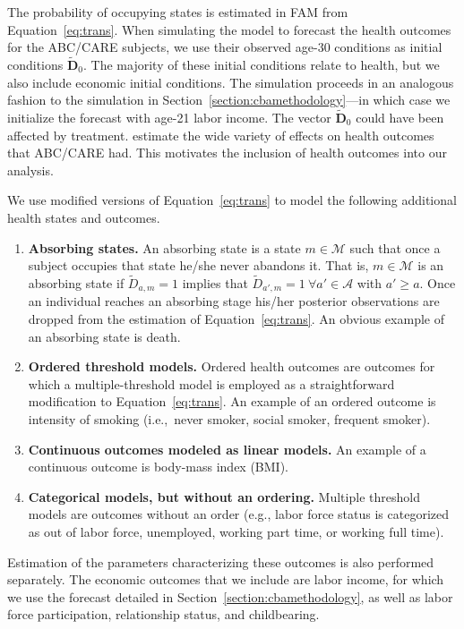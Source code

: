 The probability of occupying states is estimated in FAM from Equation~\eqref{eq:trans}. When simulating the model to forecast the health outcomes for the ABC/CARE subjects, we use their observed age-30 conditions as initial conditions  $\tilde{\bm{D}}_0$. The majority of these initial conditions relate to health, but we also include economic initial conditions. The simulation proceeds in an analogous fashion to the simulation in Section~\ref{section:cbamethodology}---in which case we initialize the forecast with age-21 labor income. The vector $\tilde{\bm{D}}_0$ could have been affected by treatment. \citet{Campbell_Conti_etal_2014_EarlyChildhoodInvestments} estimate the wide variety of effects on health outcomes that ABC/CARE had. This motivates the inclusion of health outcomes into our analysis.

We use modified versions of Equation~\eqref{eq:trans} to model the following additional health states and outcomes.

\begin{enumerate}
\item \textbf{Absorbing states.} An absorbing state is a state $m \in \mathcal{M}$ such that once a subject occupies that state he/she never abandons it. That is, $m \in \mathcal{M}$ is an absorbing state if $\tilde{D}_{a,m} = 1$ implies that $\tilde{D}_{a',m} = 1 \ \forall a' \in \mathcal{A}$ with $a' \geq a.$ Once an individual reaches an absorbing stage his/her posterior observations are dropped from the estimation of Equation~\eqref{eq:trans}. An obvious example of an absorbing state is death.
\item \textbf{Ordered threshold models.} Ordered health outcomes are outcomes for which a multiple-threshold model is employed as a straightforward modification to Equation~\eqref{eq:trans}. An example of an ordered outcome is intensity of smoking (i.e.,\ never smoker, social smoker, frequent smoker).
\item \textbf{Continuous outcomes modeled as linear models.} An example of a continuous outcome is body-mass index (BMI).
\item \textbf{Categorical models, but without an ordering.} Multiple threshold models are outcomes without an order (e.g., labor force status is categorized as out of labor force, unemployed, working part time, or working full time).
\end{enumerate}

Estimation of the parameters characterizing these outcomes is also performed separately. The economic outcomes that we include are labor income, for which we use the forecast detailed in Section~\ref{section:cbamethodology}, as well as labor force participation, relationship status, and childbearing. 

